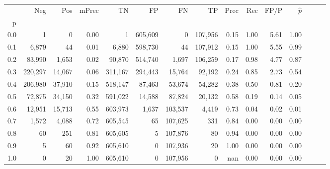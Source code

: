 \begin{tabular}{rrrrrrrrrrrrrrr}
\toprule
{} &      Neg &     Pos & mPrec &       TN &       FP &       FN &       TP &  Prec &   Rec &  FP/P & $\hat{p}$ \\
p   &          &         &       &          &          &          &          &       &       &       &           \\
\midrule
0.0 &        1 &       0 &  0.00 &        1 &  605,609 &        0 &  107,956 &  0.15 &  1.00 &  5.61 &      1.00 \\
0.1 &    6,879 &      44 &  0.01 &    6,880 &  598,730 &       44 &  107,912 &  0.15 &  1.00 &  5.55 &      0.99 \\
0.2 &   83,990 &   1,653 &  0.02 &   90,870 &  514,740 &    1,697 &  106,259 &  0.17 &  0.98 &  4.77 &      0.87 \\
0.3 &  220,297 &  14,067 &  0.06 &  311,167 &  294,443 &   15,764 &   92,192 &  0.24 &  0.85 &  2.73 &      0.54 \\
0.4 &  206,980 &  37,910 &  0.15 &  518,147 &   87,463 &   53,674 &   54,282 &  0.38 &  0.50 &  0.81 &      0.20 \\
0.5 &   72,875 &  34,150 &  0.32 &  591,022 &   14,588 &   87,824 &   20,132 &  0.58 &  0.19 &  0.14 &      0.05 \\
0.6 &   12,951 &  15,713 &  0.55 &  603,973 &    1,637 &  103,537 &    4,419 &  0.73 &  0.04 &  0.02 &      0.01 \\
0.7 &    1,572 &   4,088 &  0.72 &  605,545 &       65 &  107,625 &      331 &  0.84 &  0.00 &  0.00 &      0.00 \\
0.8 &       60 &     251 &  0.81 &  605,605 &        5 &  107,876 &       80 &  0.94 &  0.00 &  0.00 &      0.00 \\
0.9 &        5 &      60 &  0.92 &  605,610 &        0 &  107,936 &       20 &  1.00 &  0.00 &  0.00 &      0.00 \\
1.0 &        0 &      20 &  1.00 &  605,610 &        0 &  107,956 &        0 &   nan &  0.00 &  0.00 &      0.00 \\
\bottomrule
\end{tabular}
